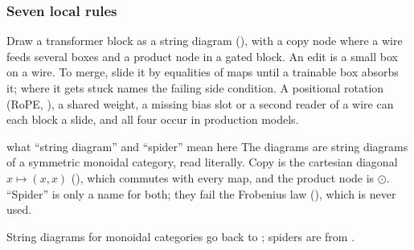 \subsubsection{Seven local rules}\label{sec:merge-calculus}

Draw a transformer block as a string diagram (), with a copy node where a wire feeds several boxes and a
product node in a gated block. An edit is a small box on a wire. To merge, slide it by equalities of maps until a
trainable box absorbs it; where it gets stuck names the failing side condition. A positional rotation (RoPE,
\citealp{xsu2024roformer}), a shared weight, a missing bias slot or a second reader of a wire can each block a slide, and
all four occur in production models.

\begingroup\renewcommand{\label}[1]{}%
\begin{analogy*}{what ``string diagram'' and ``spider'' mean here}
The diagrams are string diagrams of a symmetric monoidal category, read literally. Copy is the cartesian diagonal
$x\mapsto(x,x)$ (), which commutes with every map, and the product node is $\odot$. ``Spider'' is only a name
for both; they fail the Frobenius law (), which is never used.
\end{analogy*}
\endgroup

String diagrams for monoidal categories go back to \citet{xjoyal1991geometry}; spiders are from \citet{xcoecke2013new}.

